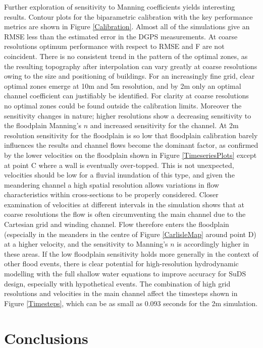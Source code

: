 \documentclass[11pt,english,a4paper]{article}
\begin{document}
Further exploration of sensitivity to Manning coefficients yields interesting results. Contour plots for the biparametric calibration with the key performance metrics are shown in Figure \ref{Calibration}. Almost all of the simulations give an RMSE less than the estimated error in the DGPS measurements. At coarse resolutions optimum performance with respect to RMSE and F are not coincident. There is no consistent trend in the pattern of the optimal zones, as the resulting topography after interpolation can vary greatly at coarse resolutions owing to the size and positioning of buildings. For an increasingly fine grid, clear optimal zones emerge at 10m and 5m resolution, and by 2m only an optimal channel coefficient can justifiably be identified. For clarity at coarse resolutions no optimal zones could be found outside the calibration limits. Moreover the sensitivity changes in nature; higher resolutions show a decreasing sensitivity to the floodplain Manning's \(n\) and increased sensitivity for the channel. At 2m resolution sensitivity for the floodplain is so low that floodplain calibration barely influences the results and channel flows become the dominant factor, as confirmed by the lower velocities on the floodplain shown in Figure \ref{TimeseriesPlots} except at point C where a wall is eventually over-topped. This is not unexpected, velocities should be low for a fluvial inundation of this type, and given the meandering channel a high spatial resolution allows variations in flow characteristics within cross-sections to be properly considered. Closer examination of velocities at different intervals in the simulation shows that at coarse resolutions the flow is often circumventing the main channel due to the Cartesian grid and winding channel. Flow therefore enters the floodplain (especially in the meanders in the centre of Figure \ref{CarlisleMap} around point D) at a higher velocity, and the sensitivity to Manning's \(n\) is accordingly higher in these areas. If the low floodplain sensitivity holds more generally in the context of other flood events, there is clear potential for high-resolution hydrodynamic modelling with the full shallow water equations to improve accuracy for SuDS design, especially with hypothetical events. The combination of high grid resolutions and velocities in the main channel affect the timesteps shown in Figure \ref{Timesteps}, which can be as small as 0.093 seconds for the 2m simulation. 

\section{Conclusions}
\end{document}
